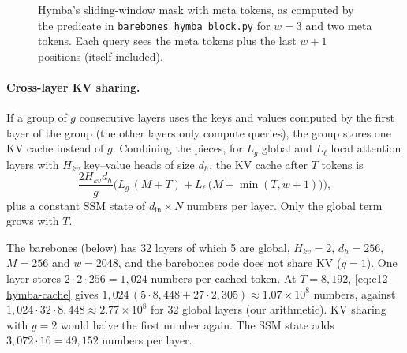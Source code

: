 \begin{figure}[t]
\centering
{}
\caption{Hymba's sliding-window mask with meta tokens, as computed by the predicate in
\texttt{barebones\_hymba\_block.py} for $w=3$ and two meta tokens. Each query sees the meta
tokens plus the last $w+1$ positions (itself included).}
\label{fig:c12-hymba-mask}
\end{figure}

\paragraph{Cross-layer KV sharing.} If a group of $g$ consecutive layers uses the keys and values
computed by the first layer of the group (the other layers only compute queries), the group
stores one KV cache instead of $g$. Combining the pieces, for $L_g$ global and $L_\ell$ local
attention layers with $H_{kv}$ key--value heads of size $d_h$, the KV cache after $T$ tokens is
\begin{equation}\label{eq:c12-hymba-cache}
  \frac{2H_{kv}d_h}{g}\Big(L_g\,(M+T) + L_\ell\,\big(M+\min(T,w+1)\big)\Big),
\end{equation}
plus a constant SSM state of $d_{\mathrm{in}}\times N$ numbers per layer. Only the global term
grows with $T$.

\begin{example}\label{ex:c12-hymba-cache}
The barebones  (below) has 32 layers of which 5 are global, $H_{kv}=2$, $d_h =
256$, $M = 256$ and $w = 2048$, and the barebones code does not share KV ($g=1$). One layer stores
$2\cdot2\cdot256 = 1{,}024$ numbers per cached token. At $T = 8{,}192$,
\eqref{eq:c12-hymba-cache} gives $1{,}024\,(5\cdot8{,}448 + 27\cdot2{,}305)\approx1.07\times10^8$
numbers, against $1{,}024\cdot32\cdot8{,}448\approx2.77\times10^8$ for 32 global layers (our
arithmetic). KV sharing with $g = 2$ would halve the first number again. The SSM state adds
$3{,}072\cdot16 = 49{,}152$ numbers per layer.
\end{example}

